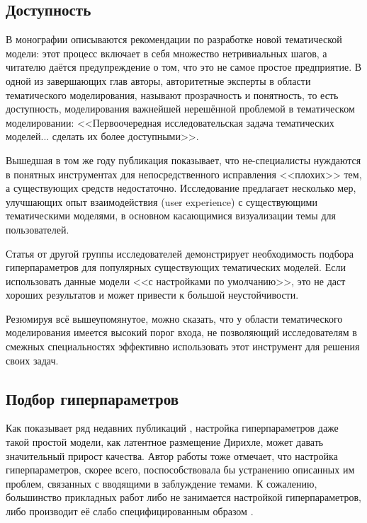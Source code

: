 \subsection{Доступность}

В монографии \cite{fntir2017applications} описываются рекомендации по разработке новой тематической модели: этот процесс включает в себя множество нетривиальных шагов, а читателю даётся предупреждение о том, что это не самое простое предприятие. В одной из завершающих глав авторы, авторитетные эксперты в области тематического моделирования, называют прозрачность и понятность, то есть доступность, моделирования важнейшей нерешённой проблемой в тематическом моделировании: <<Первоочередная исследовательская задача тематических моделей... сделать их более доступными>>.

Вышедшая в том же году публикация \cite{lee2017human} показывает, что не-специалисты нуждаются в понятных инструментах для непосредственного исправления <<плохих>> тем, а существующих средств недостаточно. Исследование предлагает несколько мер, улучшающих опыт взаимодействия (user experience) с существующими тематическими моделями, в основном касающимися визуализации темы для пользователей.

Статья от другой группы исследователей \cite{agrawal2018wrong} демонстрирует необходимость подбора гиперпараметров для популярных существующих тематических моделей. Если использовать данные модели <<с настройками по умолчанию>>, это не даст хороших результатов и может привести к большой неустойчивости.

Резюмируя всё вышеупомянутое, можно сказать, что у области тематического моделирования имеется высокий порог входа, не позволяющий исследователям в смежных специальностях эффективно использовать этот инструмент для решения своих задач.

\subsection{Подбор гиперпараметров}

Как показывает ряд недавних публикаций \cite{agrawal2018wrong,fan2019assessing}, настройка гиперпараметров даже такой простой модели, как латентное размещение Дирихле, может давать значительный прирост качества.  Автор работы \cite{dh_sea} тоже отмечает, что настройка гиперпараметров, скорее всего, поспособствовала бы устранению описанных им проблем, связанных с вводящими в заблуждение темами.  К сожалению, большинство прикладных работ либо не занимается настройкой гиперпараметров, либо производит её слабо специфицированным образом \cite{agrawal2018wrong}.

